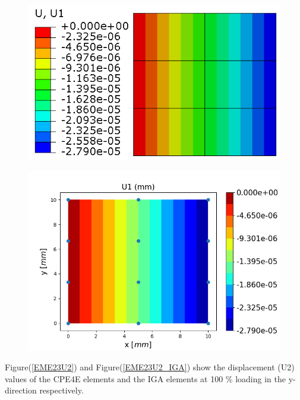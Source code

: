 \documentclass[12pt]{article}
\begin{document}
\begin{figure}[H]
	\centering
	\begin{minipage}{.5\textwidth}
		\centering
		\includegraphics[width=1\linewidth]{EME23U1.png}
		\label{EME23U1}
	\end{minipage}%
	\begin{minipage}{.6\textwidth}
		\centering
		\includegraphics[width=1\linewidth]{EME23U1_IGA.png}
		\label{EME23U1_IGA}
	\end{minipage}
\end{figure}
\noindent
Figure(\ref{EME23U2}) and Figure(\ref{EME23U2_IGA}) show the displacement (U2) values of the CPE4E elements and the IGA elements at 100 \% loading in the y-direction respectively. \\
\end{document}
